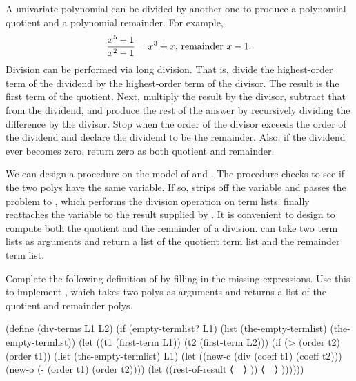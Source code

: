 \begin{exercise}
	\label{Exercise 2.91}
	A univariate polynomial can be divided by another one to produce a polynomial quotient and a polynomial remainder.
	For example,
	\[
		\text{\( \frac{x^5 - 1}{x^2 - 1} = x^3 + x \), remainder \( x - 1 \).}
	\]
	Division can be performed via long division.
	That is, divide the highest-order term of the dividend by the highest-order term of the divisor.
	The result is the first term of the quotient.
	Next, multiply the result by the divisor, subtract that from the dividend, and produce the rest of the answer by recursively dividing the difference by the divisor.
	Stop when the order of the divisor exceeds the order of the dividend and declare the dividend to be the remainder.
	Also, if the dividend ever becomes zero, return zero as both quotient and remainder.

	We can design a  procedure on the model of  and .
	The procedure checks to see if the two polys have the same variable.
	If so,  strips off the variable and passes the problem to , which performs the division operation on term lists.
	 finally reattaches the variable to the result supplied by .
	It is convenient to design  to compute both the quotient and the remainder of a division.
	 can take two term lists as arguments and return a list of the quotient term list and the remainder term list.

	Complete the following definition of  by filling in the missing expressions.
	Use this to implement , which takes two polys as arguments and returns a list of the quotient and remainder polys.
	\begin{smallscheme}
	  (define (div-terms L1 L2)
	    (if (empty-termlist? L1)
	        (list (the-empty-termlist) (the-empty-termlist))
	        (let ((t1 (first-term L1))
	              (t2 (first-term L2)))
	          (if (> (order t2) (order t1))
	              (list (the-empty-termlist) L1)
	              (let ((new-c (div (coeff t1) (coeff t2)))
	                    (new-o (- (order t1) (order t2))))
	                (let ((rest-of-result
	                       ⟨~~⟩
	                     ))
	                  ⟨~~⟩
	                  ))))))
	\end{smallscheme}
\end{exercise}



